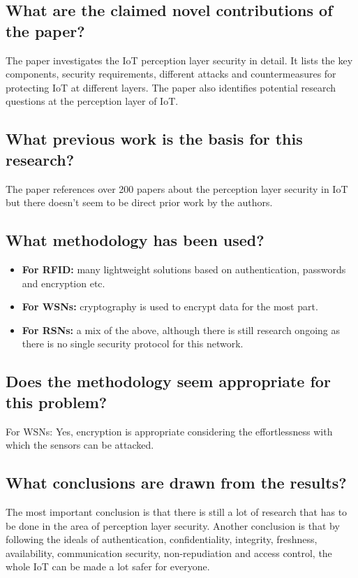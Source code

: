 \documentclass[11pt,a4paper]{article}
\begin{document}
\subsection*{What are the claimed novel contributions of the paper?}
The paper investigates the IoT perception layer security in detail. It lists the key components, security requirements, different attacks and countermeasures for protecting IoT at different layers. The paper also identifies potential research questions at the perception layer of IoT. 

\subsection*{What previous work is the basis for this research?}
The paper references over 200 papers about the perception layer security in IoT but there doesn’t seem to be direct prior work by the authors. 

\subsection*{What methodology has been used?}

\begin{itemize}
    \item \textbf{For RFID:} many lightweight solutions based on authentication, passwords and encryption etc.
    \item \textbf{For WSNs:} cryptography is used to encrypt data for the most part.
    \item \textbf{For RSNs:} a mix of the above, although there is still research ongoing as there is no single security protocol for this network.
\end{itemize}

\subsection*{Does the methodology seem appropriate for this problem?}
For WSNs: Yes, encryption is appropriate considering the effortlessness with which the sensors can be attacked.

\subsection*{What conclusions are drawn from the results?}
The most important conclusion is that there is still a lot of research that has to be done in the area of perception layer security. Another conclusion is that by following the ideals of authentication, confidentiality, integrity, freshness, availability, communication security, non-repudiation and access control, the whole IoT can be made a lot safer for everyone. 
\end{document}

